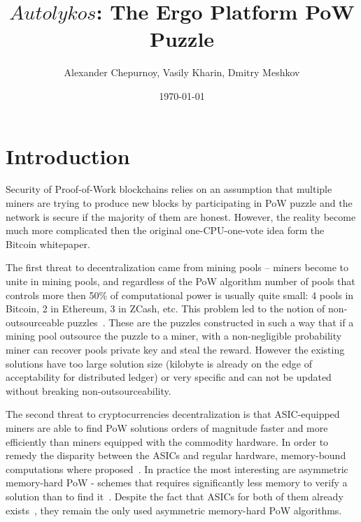 \documentclass[]{article}
\newcommand{\Name}{$Autolykos$}
\begin{document}
    \title{\Name: The Ergo Platform PoW Puzzle}

    \author{Alexander Chepurnoy, Vasily Kharin, Dmitry Meshkov}

    \date{\today}
    \maketitle



    \section{Introduction}

    Security of Proof-of-Work blockchains relies on an assumption
    that multiple miners are trying to produce new blocks by
    participating in PoW puzzle and the network is secure if the
    majority of them are honest. However, the reality become much more complicated
    then the original one-CPU-one-vote idea form the Bitcoin whitepaper\cite{nakamoto2008bitcoin}.

    The first threat to decentralization came from mining pools -- miners become to unite in mining pools,
    and regardless of the PoW algorithm number of pools that controls more then 50\% of
    computational power is usually quite small: 4 pools in Bitcoin, 2 in Ethereum, 3 in ZCash, etc.
    This problem led to the notion of non-outsourceable puzzles~\cite{miller2015nonoutsourceable,daian2017piecework}.
    These are the puzzles constructed in such a way that if a mining pool outsource the puzzle
    to a miner, with a non-negligible probability miner can recover pools private key and steal the reward.
    However the existing solutions have too large solution size (kilobyte is already
    on the edge of acceptability for distributed ledger) or very specific and
    can not be updated without breaking non-outsourceability.

    The second threat to cryptocurrencies decentralization is that ASIC-equipped miners are
    able to find PoW solutions orders of magnitude faster and more efficiently
    than miners equipped with the commodity hardware. In order to remedy the
    disparity between the ASICs and regular hardware, memory-bound computations
    where proposed~\cite{dwork2003memory}. In practice the most interesting are
    asymmetric memory-hard PoW - schemes that requires significantly less memory
    to verify a solution than to find it~\cite{biryukov2017equihash,ethHash}.
    Despite the fact that ASICs for both of them already exists~\cite{ETHAsics,EquihashAsics},
    they remain the only used asymmetric memory-hard PoW algorithms.
\end{document}
